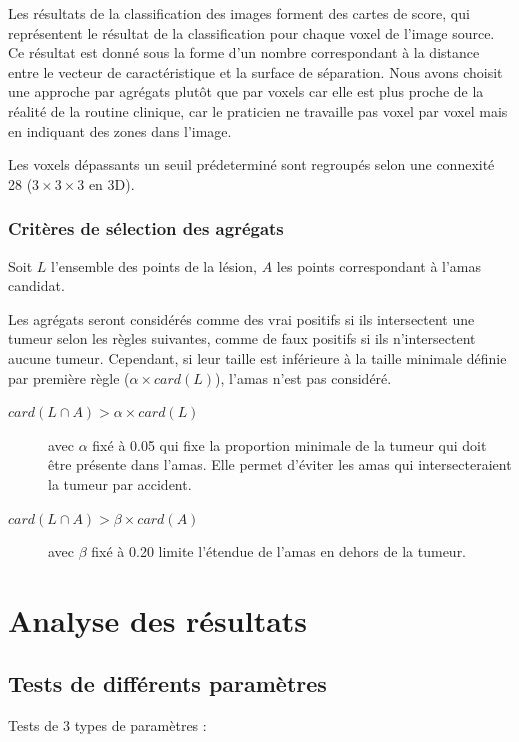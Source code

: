 Les résultats de la classification des images forment des cartes de score, qui représentent le résultat de la classification pour chaque voxel de l'image source. Ce résultat est donné sous la forme d'un nombre correspondant à la distance entre le vecteur de caractéristique et la surface de séparation. Nous avons choisit une approche par agrégats plutôt que par voxels car elle est plus proche de la réalité de la routine clinique, car le praticien ne travaille pas voxel par voxel mais en indiquant des zones dans l'image.

Les voxels dépassants un seuil prédeterminé sont regroupés selon une connexité 28 ($3\times3\times3$ en 3D). 


\subsection{Critères de sélection des agrégats}

Soit $L$ l'ensemble des points de la lésion, $A$ les points correspondant à l'amas candidat.

Les agrégats seront considérés comme des vrai positifs si ils intersectent une tumeur selon les règles suivantes, comme de faux positifs si ils n'intersectent aucune tumeur. Cependant, si leur taille est inférieure à la taille minimale définie par première règle ($\alpha \times card( L )$), l'amas n'est pas considéré.


\begin{description}
 \item[$card( L \cap A ) > \alpha \times card( L )$] avec $\alpha$ fixé à 0.05 qui fixe la proportion minimale de la tumeur qui doit être présente dans l'amas. Elle permet d'éviter les amas qui intersecteraient la tumeur par accident.
 \item[$card( L \cap A ) > \beta \times card( A )$]  avec $\beta$ fixé à 0.20 limite l'étendue de l'amas en dehors de la tumeur.
\end{description}


\chapter{Analyse des résultats}

\section{Tests de différents paramètres}

Tests de 3 types de paramètres : 


